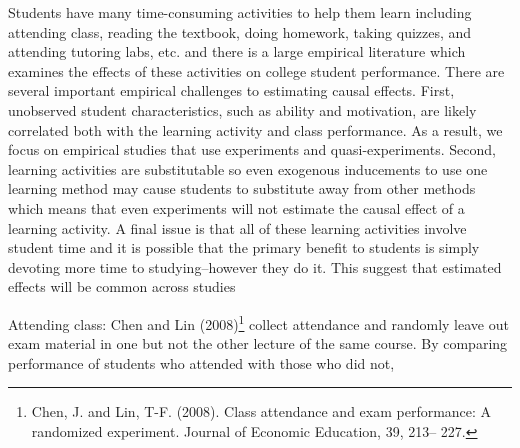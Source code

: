 \documentclass[12pt]{article}
\begin{document}
Students have many time-consuming activities to help them learn including attending class, reading the textbook, doing homework, taking quizzes, and attending tutoring labs, etc. and there is a large empirical literature which examines the effects of these activities on college student performance.  There are several important empirical challenges to estimating causal effects.  First, unobserved student characteristics, such as ability and motivation, are likely correlated both with the learning activity and class performance.  As a result, we focus on empirical studies that use experiments and quasi-experiments.  Second, learning activities are substitutable so even exogenous inducements to use one learning method may cause students to substitute away from other methods which means that even experiments will not estimate the causal effect of a learning activity.  A final issue is that all of these learning activities involve student time and it is possible that the primary benefit to students is simply devoting more time to studying--however they do it. This suggest that estimated effects will be common across studies   

Attending class:  Chen and Lin (2008)\footnote{Chen, J. and Lin, T-F. (2008). Class attendance and exam performance: A randomized experiment. Journal of Economic Education, 39, 213– 227.} collect attendance and randomly leave out exam material in one but not the other lecture of the same course.  By comparing performance of students who attended with those who did not, 
\end{document}
